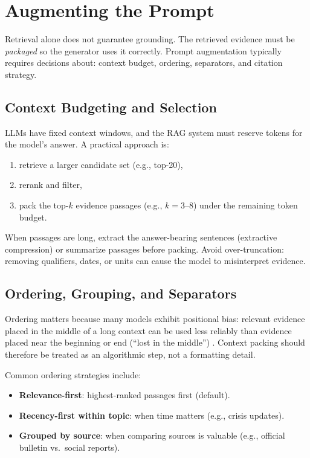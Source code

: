 \FloatBarrier
\section{Augmenting the Prompt}
\label{sec:rag-augmenting-the-prompt}
Retrieval alone does not guarantee grounding. The retrieved evidence must be \emph{packaged} so the generator uses it correctly. Prompt augmentation typically requires decisions about: context budget, ordering, separators, and citation strategy.

\subsection{Context Budgeting and Selection}
LLMs have fixed context windows, and the RAG system must reserve tokens for the model's answer. A practical approach is:
\begin{enumerate}
    \item retrieve a larger candidate set (e.g., top-20),
    \item rerank and filter,
    \item pack the top-$k$ evidence passages (e.g., $k=3$--$8$) under the remaining token budget.
\end{enumerate}
When passages are long, extract the answer-bearing sentences (extractive compression) or summarize passages before packing. Avoid over-truncation: removing qualifiers, dates, or units can cause the model to misinterpret evidence.

\subsection{Ordering, Grouping, and Separators}
Ordering matters because many models exhibit positional bias: relevant evidence placed in the middle of a long context can be used less reliably than evidence placed near the beginning or end (``lost in the middle'') \cite{Liu2024LostInTheMiddle}. Context packing should therefore be treated as an algorithmic step, not a formatting detail.

Common ordering strategies include:
\begin{itemize}
    \item \textbf{Relevance-first}: highest-ranked passages first (default).
    \item \textbf{Recency-first within topic}: when time matters (e.g., crisis updates).
    \item \textbf{Grouped by source}: when comparing sources is valuable (e.g., official bulletin vs.\ social reports).
\end{itemize}

